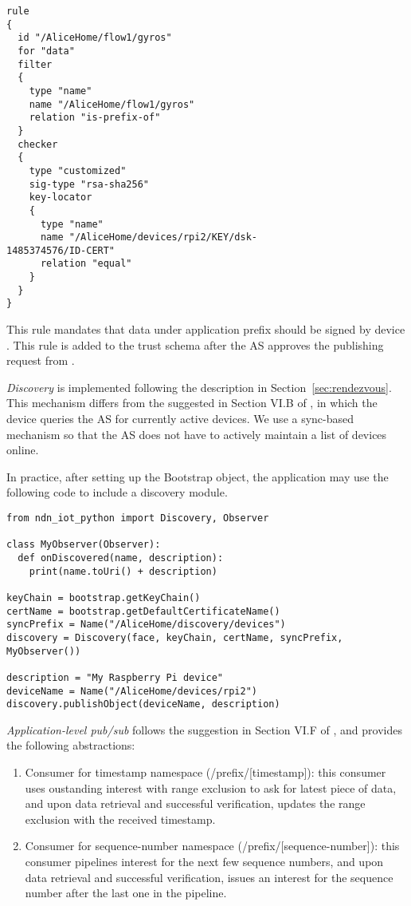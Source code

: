 \begin{verbatim}
rule 
{
  id "/AliceHome/flow1/gyros"
  for "data"
  filter 
  {
    type "name"
    name "/AliceHome/flow1/gyros"
    relation "is-prefix-of"
  }
  checker 
  {
    type "customized"
    sig-type "rsa-sha256"
    key-locator 
    {
      type "name"
      name "/AliceHome/devices/rpi2/KEY/dsk-
1485374576/ID-CERT"
      relation "equal"
    }
  }
}
\end{verbatim}
This rule mandates that data under application prefix  should be signed by device .
This rule is added to the trust schema after the AS approves the publishing request from .

\emph{Discovery} is implemented following the description in Section~\ref{sec:rendezvous}. 
This mechanism differs from the suggested in Section VI.B of \cite{ndn-iot}, in which the device queries the AS for currently active devices.
We use a sync-based mechanism so that the AS does not have to actively maintain a list of devices online.

In practice, after setting up the Bootstrap object, the application may use the following code to include a discovery module.
\begin{verbatim}
from ndn_iot_python import Discovery, Observer

class MyObserver(Observer):
  def onDiscovered(name, description):
    print(name.toUri() + description)

keyChain = bootstrap.getKeyChain()
certName = bootstrap.getDefaultCertificateName()
syncPrefix = Name("/AliceHome/discovery/devices")
discovery = Discovery(face, keyChain, certName, syncPrefix, MyObserver())

description = "My Raspberry Pi device"
deviceName = Name("/AliceHome/devices/rpi2")
discovery.publishObject(deviceName, description)
\end{verbatim}

\emph{Application-level pub/sub} follows the suggestion in Section VI.F of \cite{ndn-iot}, and provides the following abstractions:
\begin{enumerate}
\item Consumer for timestamp namespace (/prefix/[timestamp]): this consumer uses oustanding interest with range exclusion to ask for latest piece of data, and upon data retrieval and successful verification, updates the range exclusion with the received timestamp.
\item Consumer for sequence-number namespace (/prefix/[sequence-number]): this consumer pipelines interest for the next few sequence numbers, and upon data retrieval and successful verification, issues an interest for the sequence number after the last one in the pipeline.
\end{enumerate}

